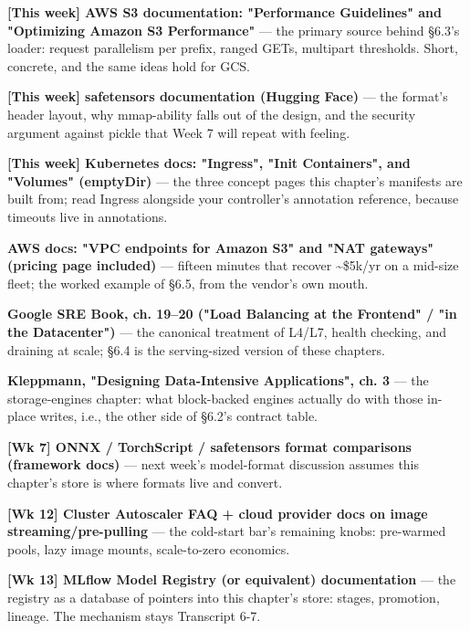 \begin{tbbitemize}
  \item \textbf{[This week] AWS S3 documentation: "Performance Guidelines" and "Optimizing Amazon S3 Performance"} — the primary source behind §6.3's loader: request parallelism per prefix, ranged GETs, multipart thresholds. Short, concrete, and the same ideas hold for GCS.
  \item \textbf{[This week] safetensors documentation (Hugging Face)} — the format's header layout, why mmap-ability falls out of the design, and the security argument against pickle that Week 7 will repeat with feeling.
  \item \textbf{[This week] Kubernetes docs: "Ingress", "Init Containers", and "Volumes" (emptyDir)} — the three concept pages this chapter's manifests are built from; read Ingress alongside your controller's annotation reference, because timeouts live in annotations.
  \item \textbf{AWS docs: "VPC endpoints for Amazon S3" and "NAT gateways" (pricing page included)} — fifteen minutes that recover \textasciitilde{}\$5k/yr on a mid-size fleet; the worked example of §6.5, from the vendor's own mouth.
  \item \textbf{Google SRE Book, ch. 19–20 ("Load Balancing at the Frontend" / "in the Datacenter")} — the canonical treatment of L4/L7, health checking, and draining at scale; §6.4 is the serving-sized version of these chapters.
  \item \textbf{Kleppmann, "Designing Data-Intensive Applications", ch. 3} — the storage-engines chapter: what block-backed engines actually do with those in-place writes, i.e., the other side of §6.2's contract table.
  \item \textbf{[Wk 7] ONNX / TorchScript / safetensors format comparisons (framework docs)} — next week's model-format discussion assumes this chapter's store is where formats live and convert.
  \item \textbf{[Wk 12] Cluster Autoscaler FAQ + cloud provider docs on image streaming/pre-pulling} — the cold-start bar's remaining knobs: pre-warmed pools, lazy image mounts, scale-to-zero economics.
  \item \textbf{[Wk 13] MLflow Model Registry (or equivalent) documentation} — the registry as a database of pointers into this chapter's store: stages, promotion, lineage. The mechanism stays Transcript 6-7.
\end{tbbitemize}

\vspace{5.0pt}

